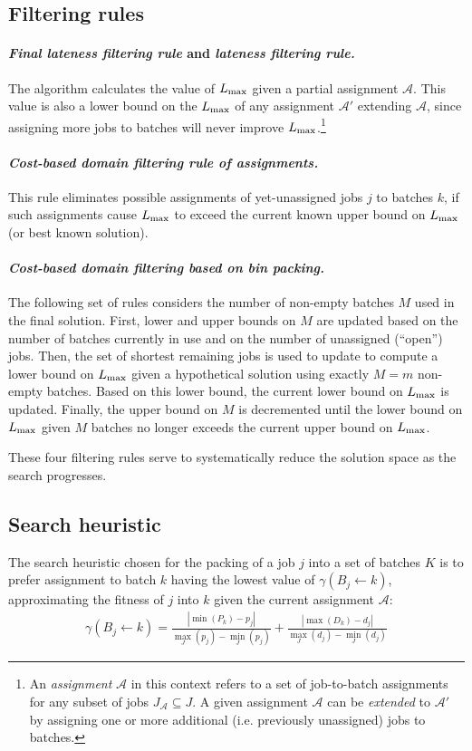 \documentclass[13pt, letterpaper, oneside]{book}
\begin{document}
\subsection{Filtering rules}
\paragraph{\textit{Final lateness filtering rule} and \textit{lateness filtering
rule.}} The algorithm calculates the value
of $L_{\text{max}}$ given a partial assignment $\mathcal{A}$. This value is also a lower
bound on the $L_{\text{max}}$ of any assignment $\mathcal{A}'$ extending $\mathcal{A}$,
since assigning more jobs to batches will never improve $L_{\text{max}}$.\footnote{An
\textit{assignment} $\mathcal{A}$ in this context refers to a set of
job-to-batch assignments for any subset of jobs $J_\mathcal{A} \subseteq J$. A
given assignment $\mathcal{A}$ can be \textit{extended} to $\mathcal{A}'$ by
assigning one or more additional (i.e.  previously unassigned) jobs to batches.}

\paragraph{\textit{Cost-based domain filtering rule of assignments.}} This rule
eliminates possible assignments of yet-unassigned jobs $j$ to batches $k$, if
such assignments cause $L_{\text{max}}$ to exceed the current known upper bound on
$L_{\text{max}}$ (or best known solution).

\paragraph{\textit{Cost-based domain filtering based on bin packing.}} The
following set of rules considers the number of non-empty batches $M$ used in the
final solution. First, lower and upper bounds on $M$ are updated based on the
number of batches currently in use and on the number of unassigned (``open'')
jobs. Then, the set of shortest remaining jobs is used to update to compute a
lower bound on $L_{\text{max}}$ given a hypothetical solution using exactly $M = m$
non-empty batches. Based on this lower bound, the current lower bound on
$L_{\text{max}}$ is updated. Finally, the upper bound on $M$ is decremented until the
lower bound on $L_{\text{max}}$ given $M$ batches no longer exceeds the current upper
bound on $L_{\text{max}}$.

These four filtering rules serve to systematically reduce the solution space as
the search progresses.

\subsection{Search heuristic}
\label{sec:bestfit}
The search heuristic chosen for the packing of a job $j$ into a set of batches
$K$ is to prefer assignment to batch $k$ having the lowest value of $\gamma(B_j
\leftarrow k)$, approximating the fitness of $j$ into $k$ given the current
assignment $\mathcal{A}$:
\begin{align}
\gamma(B_j \leftarrow k) = \frac{ |\min(P_k) - p_j| }{\underset{J}{\max}(p_j) -
\underset{J}{\min}(p_j)} + \frac{ |\max(D_k) - d_j| }{\underset{J}{\max}(d_j) -
\underset{J}{\min}(d_j)}
\end{align}
\end{document}
